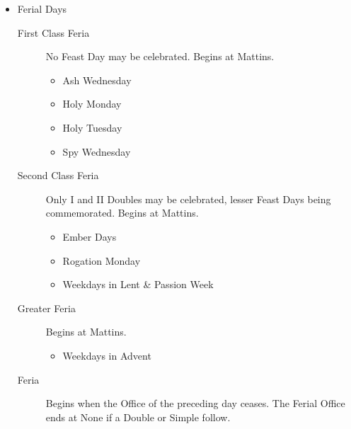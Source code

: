 \begin{itemize}
    \item Ferial Days
        \begin{description}
            \item[First Class Feria] No Feast Day may be celebrated. Begins at Mattins.
                \begin{itemize}
                    \item Ash Wednesday
                    \item Holy Monday
                    \item Holy Tuesday
                    \item Spy Wednesday
                \end{itemize}
            \item[Second Class Feria] Only I and II Doubles may be celebrated, lesser Feast Days being commemorated. Begins at Mattins.
            	\begin{itemize}
            		\item Ember Days
            		\item Rogation Monday
            		\item Weekdays in Lent \& Passion Week
            	\end{itemize}
            \item[Greater Feria] Begins at Mattins. 
                \begin{itemize}
                    \item Weekdays in Advent
                \end{itemize}
            \item[Feria] Begins when the Office of the preceding day ceases. The Ferial Office ends at None if a Double or Simple follow.
        \end{description}
        

\end{itemize}
